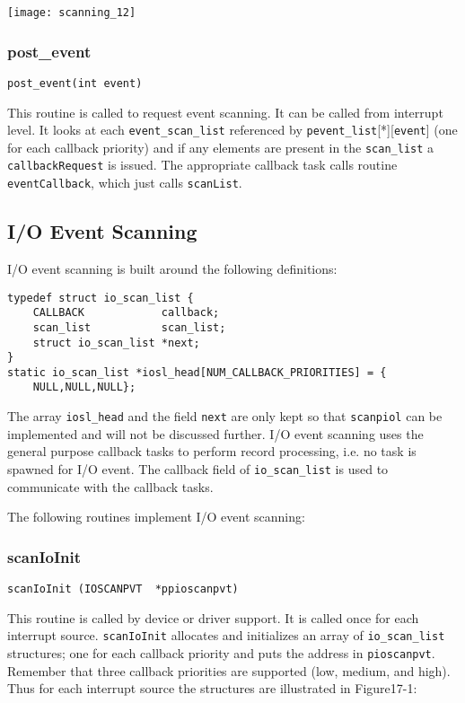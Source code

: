 \begin{center}
\texttt{[image: scanning\_12]}
\end{center}

\subsubsection{post\_event} 

\begin{verbatim}post_event(int event)
\end{verbatim}This routine is called to request  event scanning. It can be called from interrupt level. It looks at each 
\verb|event_scan_list| referenced by \verb|pevent_list|[*][\verb|event|] (one for each callback priority) and if any elements are 
present in the \verb|scan_list| a \verb|callbackRequest| is issued. The appropriate callback task calls routine 
\verb|eventCallback|, which just calls \verb|scanList|. 

\subsection{I/O Event Scanning}

I/O event scanning is built around the following definitions:

\begin{verbatim}
typedef struct io_scan_list {
    CALLBACK            callback;
    scan_list           scan_list;
    struct io_scan_list *next;
}
static io_scan_list *iosl_head[NUM_CALLBACK_PRIORITIES] = {
    NULL,NULL,NULL};
\end{verbatim}The array \verb|iosl_head| and the field \verb|next| are only kept so that \verb|scanpiol| can be implemented and will not be discussed 
further. I/O event scanning uses the general purpose callback tasks to perform record processing, i.e. no task is spawned 
for I/O event. The callback field of \verb|io_scan_list| is used to communicate with the callback tasks.

The following routines implement I/O event scanning:

\subsubsection{scanIoInit}

\begin{verbatim}scanIoInit (IOSCANPVT  *ppioscanpvt)
\end{verbatim}This routine is called by device or driver support. It is called once for each interrupt source. \verb|scanIoInit| allocates and 
initializes an array of \verb|io_scan_list| structures; one for each callback priority and puts the address in \verb|pioscanpvt|. 
Remember that three callback priorities are supported (low, medium, and high). Thus for each interrupt source the 
structures are illustrated in Figure17-1:

